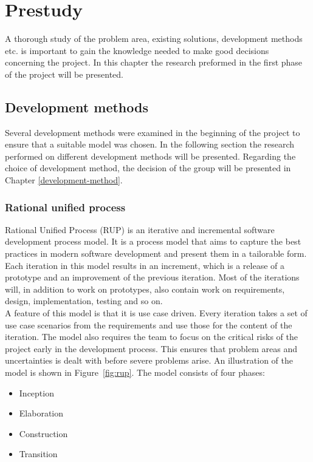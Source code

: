 \chapter{Prestudy}

\label{prestudy}

A thorough study of the problem area, existing solutions, development methods etc. is important to gain the knowledge needed to make good decisions concerning the project. In this chapter the research preformed in the first phase of the project will be presented.

\section{Development methods}
Several development methods were examined in the beginning of the project to ensure that a suitable model was chosen. In the following section the research performed on different development methods will be presented. Regarding the choice of development method, the decision of the group will be presented in Chapter \ref{development-method}.

\subsection{Rational unified process}
Rational Unified Process (RUP) is an iterative and incremental software development process model. It is a process model that aims to capture the best practices in modern software development and present them in a tailorable form.\cite{kruchten} Each iteration in this model results in an increment, which is a release of a prototype and an improvement of the previous iteration. Most of the iterations will, in addition to work on prototypes, also contain work on requirements, design, implementation, testing and so on.\\
\newline
A feature of this model is that it is use case driven. Every iteration takes a set of use case scenarios from the requirements and use those for the content of the iteration. The model also requires the team to focus on the critical risks of the project early in the development process. This ensures that problem areas and uncertainties is dealt with before severe problems arise. An illustration of the model is shown in Figure~\ref{fig:rup}.
\newline
The model consists of four phases:

\begin{itemize}
\item{Inception}
\item{Elaboration}
\item{Construction}
\item{Transition}
\end{itemize}

